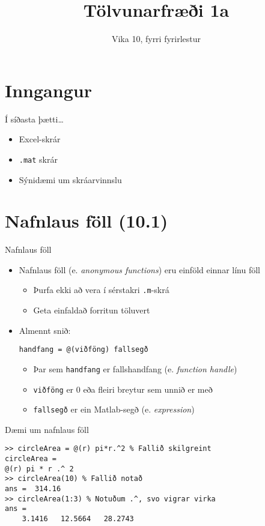 \documentclass{beamer}
\title{Tölvunarfræði 1a}
\subtitle{Vika 10, fyrri fyrirlestur}
\begin{document}
\begin{frame}
\titlepage
\end{frame}

\section{Inngangur}

\begin{frame}{Í síðasta þætti\ldots}
\begin{itemize}
 \item Excel-skrár
 \item \texttt{.mat} skrár
 \item Sýnidæmi um skráarvinnslu
\end{itemize}
\end{frame}

\section{Nafnlaus föll (10.1)}

\begin{frame}[fragile]{Nafnlaus föll}
\begin{itemize}
 \item Nafnlaus föll (e. \emph{anonymous functions}) eru einföld einnar línu föll
 \begin{itemize}
  \item Þurfa ekki að vera í sérstakri \texttt{.m}-skrá
  \item Geta einfaldað forritun töluvert
 \end{itemize}
 \item Almennt snið:
\begin{verbatim}
handfang = @(viðföng) fallsegð
\end{verbatim}
 \begin{itemize}
  \item Þar sem \texttt{handfang} er fallshandfang (e. \emph{function handle})
  \item \texttt{viðföng} er 0 eða fleiri breytur sem unnið er með
  \item \texttt{fallsegð} er ein Matlab-segð (e. \emph{expression})
 \end{itemize}
\end{itemize}
\end{frame}

\begin{frame}[fragile]{Dæmi um nafnlaus föll}
\begin{verbatim}
>> circleArea = @(r) pi*r.^2 % Fallið skilgreint
circleArea =
@(r) pi * r .^ 2
>> circleArea(10) % Fallið notað
ans =  314.16
>> circleArea(1:3) % Notuðum .^, svo vigrar virka
ans =
    3.1416   12.5664   28.2743
\end{verbatim}
\end{frame}
\end{document}
